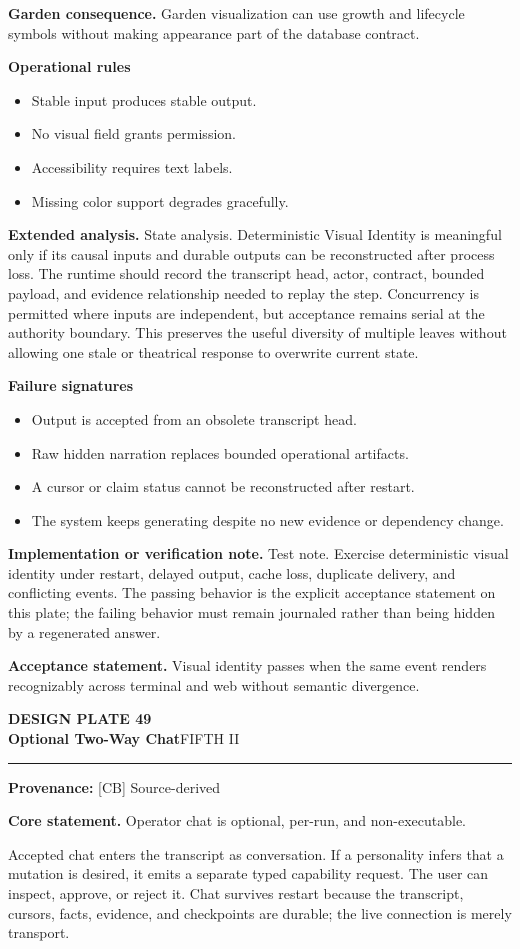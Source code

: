 \documentclass[10pt,letterpaper,oneside]{article}
\newcommand{\prov}[1]{\textcolor{gardenBlue}{\sffamily\footnotesize\textbf{Provenance:} #1}}
\newcommand{\platetitle}[3]{%
  \begin{minipage}[t][0.54in][t]{\textwidth}
  {\sffamily\bfseries\color{gardenDeep}\fontsize{9}{10}\selectfont DESIGN PLATE #1}\\[-1pt]
  {\sffamily\bfseries\color{gardenInk}\fontsize{16.5}{18}\selectfont #2}\hfill{\sffamily\color{gardenGreen}\large #3}
  \end{minipage}\vspace{-2pt}\hrule\vspace{5pt}}
\begin{document}
\textbf{Garden consequence.} Garden visualization can use growth and lifecycle symbols without making appearance part of the database contract.

\textbf{Operational rules}
\begin{itemize}
\item Stable input produces stable output.
\item No visual field grants permission.
\item Accessibility requires text labels.
\item Missing color support degrades gracefully.
\end{itemize}
\textbf{Extended analysis.} State analysis. Deterministic Visual Identity is meaningful only if its causal inputs and durable outputs can be reconstructed after process loss. The runtime should record the transcript head, actor, contract, bounded payload, and evidence relationship needed to replay the step. Concurrency is permitted where inputs are independent, but acceptance remains serial at the authority boundary. This preserves the useful diversity of multiple leaves without allowing one stale or theatrical response to overwrite current state.

\textbf{Failure signatures}
\begin{itemize}
\item Output is accepted from an obsolete transcript head.
\item Raw hidden narration replaces bounded operational artifacts.
\item A cursor or claim status cannot be reconstructed after restart.
\item The system keeps generating despite no new evidence or dependency change.
\end{itemize}
\textbf{Implementation or verification note.} Test note. Exercise deterministic visual identity under restart, delayed output, cache loss, duplicate delivery, and conflicting events. The passing behavior is the explicit acceptance statement on this plate; the failing behavior must remain journaled rather than being hidden by a regenerated answer.

\begin{acceptbox}
\textbf{Acceptance statement.} Visual identity passes when the same event renders recognizably across terminal and web without semantic divergence.
\end{acceptbox}
\newpage
\platetitle{49}{Optional Two-Way Chat}{FIFTH II}
\prov{[CB] Source-derived}
\fontsize{8.85}{10.45}\selectfont
\begin{corebox}
\textbf{Core statement.} Operator chat is optional, per-run, and non-executable.
\end{corebox}
Accepted chat enters the transcript as conversation. If a personality infers that a mutation is desired, it emits a separate typed capability request. The user can inspect, approve, or reject it. Chat survives restart because the transcript, cursors, facts, evidence, and checkpoints are durable; the live connection is merely transport.
\end{document}

